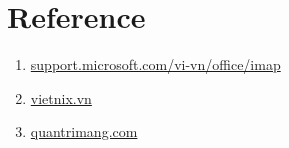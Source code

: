 \documentclass[APA,STIX1COL]{WileyNJD-v2}
\begin{document}
\section{Reference}
\begin{enumerate}
  \item \href{https://support.microsoft.com/vi-vn/office/imap-v%
  }{support.microsoft.com/vi-vn/office/imap}
  \item \href{https://vietnix.vn/pop3-va-imap-la-gi/#:~:text=POP3%20ch%E1%BB%89%20l%C6%B0u%20tr%E1%BB%AF%20c%C3%A1c,%C4%91%E1%BA%A1i%20v%C3%A0%20linh%20ho%E1%BA%A1t%20h%C6%A1n.}{vietnix.vn}
  \item \href{https://quantrimang.com/cong-nghe/phan-biet-pop-va-imap-89580
  }{quantrimang.com}
\end{enumerate}
\end{document}
